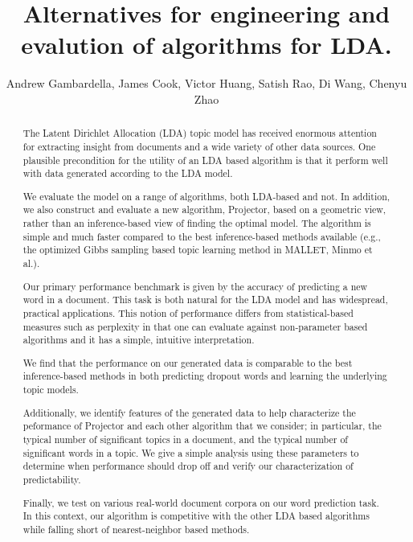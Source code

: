\documentclass{article}
\title{Alternatives for engineering and evalution of algorithms for LDA.}
\author{Andrew Gambardella, James Cook, Victor Huang, Satish Rao, Di Wang, Chenyu Zhao}
\date{}
\begin{document}
\maketitle

\begin{abstract}

The Latent Dirichlet Allocation (LDA) topic model has received enormous
attention for extracting insight from documents and a wide
variety of other data sources.  One plausible precondition for the
utility of an LDA based algorithm is that it perform well
with data generated according to the LDA model.

We evaluate the model on a range of algorithms, both LDA-based and not. In addition,
we also construct and evaluate a new algorithm, Projector, based on a geometric
view, rather than an inference-based view of finding the optimal model.
The algorithm is simple and much faster compared to the best inference-based
methods available (e.g., the optimized Gibbs sampling based topic
learning method in MALLET, Minmo et al.).

Our primary performance benchmark is given by the accuracy of predicting a new word in a
document. This task is both natural for the LDA model and has
widespread, practical applications. This notion of performance differs
from statistical-based measures such as perplexity in that
one can evaluate against non-parameter based algorithms and
it has a simple, intuitive interpretation.

We find that the performance on our generated data is comparable to the best inference-based
methods in both predicting dropout words and learning the underlying topic models.

Additionally, we identify features of the generated data to help characterize the
peformance of Projector and each other algorithm that we consider; in
particular, the typical number of significant topics in a document, and the typical
number of significant words in a topic.  We give a simple analysis using these
parameters to determine when performance should drop off and verify
our characterization of predictability.

Finally, we test on various real-world document corpora on our word prediction task.
In this context, our algorithm is competitive with the other LDA based algorithms
while falling short of nearest-neighbor based methods.



\end{abstract}
\end{document}
